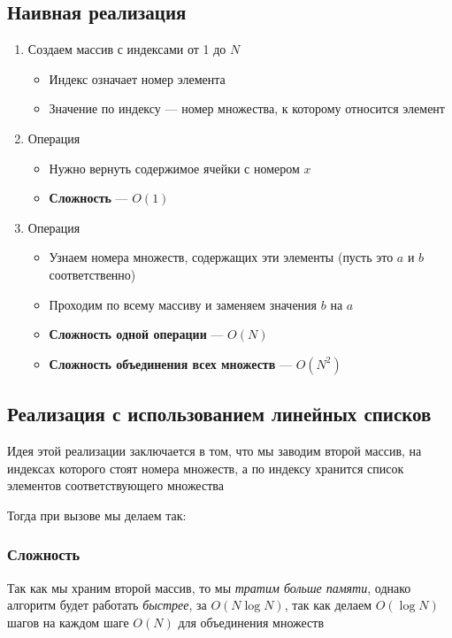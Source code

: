 \documentclass[a4paper]{article}
\begin{document}
\subsection{Наивная реализация}
\begin{enumerate}
    \item Создаем массив с индексами от 1 до $N$
    \begin{itemize}
        \item Индекс означает номер элемента
        \item Значение по индексу — номер множества, к которому относится элемент
    \end{itemize}
    \item Операция 
    \begin{itemize}
        \item Нужно вернуть содержимое ячейки с номером $x$
        \item \textbf{Сложность} — $O(1)$
    \end{itemize}
    \item Операция 
    \begin{itemize}
        \item Узнаем номера множеств, содержащих эти элементы (пусть это $a$ и $b$ соответственно)
        \item Проходим по всему массиву и заменяем значения $b$ на $a$
        \item \textbf{Сложность одной операции} — $O(N)$
        \item \textbf{Сложность объединения всех множеств} — $O(N^2)$
    \end{itemize}
\end{enumerate}

\subsection{Реализация с использованием линейных списков}
Идея этой реализации заключается в том, что мы заводим второй массив, на индексах которого стоят номера множеств, а по индексу хранится список элементов соответствующего множества

Тогда при вызове  мы делаем так: 

\subsubsection*{Сложность}
Так как мы храним второй массив, то мы \textit{тратим больше памяти}, однако алгоритм будет работать \textit{быстрее}, за $O(N\log N)$, так как делаем $O(\log N)$ шагов на каждом шаге $O(N)$ для объединения множеств
\end{document}
